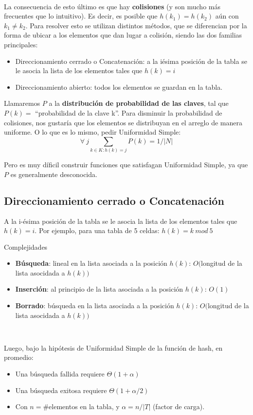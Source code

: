 ~

La consecuencia de esto \'ultimo es que hay \textbf{colisiones} (y son mucho m\'as frecuentes que lo intuitivo). Es decir, es posible que $h(k_1) = h(k_2)$ a\'un con $k_1 \neq k_2 $. Para resolver esto se utilizan distintos m\'etodos, que se diferencian por la forma de ubicar a los elementos que dan lugar a colisi\'on, siendo las dos familias principales:
\begin{itemize}
 \item Direccionamiento cerrado o Concatenaci\'on: a la i\-\'esima posici\'on de la tabla se le asocia la lista de los elementos tales que $h(k)=i$
 \item Direccionamiento abierto: todos los elementos se guardan en la tabla.
\end{itemize}

Llamaremos $P$ a la \textbf{distribuci\'on de probabilidad de las claves}, tal que $P(k) = $ ``probabilidad de la clave k''. Para disminuir la probabilidad de colisiones, nos gustar\'ia que los elementos se distribuyan en el arreglo de manera uniforme. O lo que es lo mismo, pedir Uniformidad Simple:
$$\forall\ j \sum_{k \in K : h(k) = j}P(k) = 1 / |N|$$

Pero es muy d\'ificil construir funciones que satisfagan Uniformidad Simple, ya que $P$ es generalmente desconocida.

\subsection{Direccionamiento cerrado o Concatenaci\'on}
A la i-\'esima posici\'on de la tabla se le asocia la lista de los elementos tales que $h(k)=i$. Por ejemplo, para una tabla de 5 celdas: $h(k) = k\ mod\ 5$

Complejidades
\begin{itemize}
 \item \textbf{B\'usqueda}: lineal en la lista asociada a la posici\'on $h(k)$: $O($longitud de la lista asocidada a $h(k))$
 \item \textbf{Inserci\'on}: al principio de la lista asociada a la posici\'on $h(k)$: $O(1)$
 \item \textbf{Borrado}: b\'usqueda en la lista asociada a la posici\'on $h(k)$: $O($longitud de la lista asocidada a $h(k))$
\end{itemize}

~

Luego, bajo la hip\'otesis de Uniformidad Simple de la funci\'on de hash, en promedio:
\begin{itemize}
\item Una b\'usqueda fallida requiere $\Theta(1+\alpha)$
\item Una b\'usqueda exitosa requiere $\Theta(1+\alpha / 2)$
\item Con $n=\#$elementos en la tabla, y $\alpha = n / |T|$ (factor de carga).
\end{itemize}

